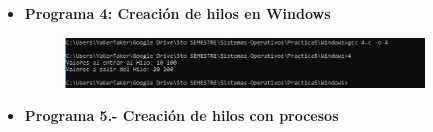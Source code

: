 \documentclass[12pt]{article}
\begin{document}
    		    \begin{itemize}

            \item[\Checkmark] \textbf{Programa 4: Creación de hilos en Windows}
            \begin{figure}[h!]
			          \centering
			         \includegraphics[width=0.9\textwidth]{Practica5/Images/windows/4.PNG}
			         \end{figure} 
            
			 \item[\Checkmark] \textbf{Programa 5.- Creación de hilos con procesos}
			 

\end{itemize}
\end{document}
